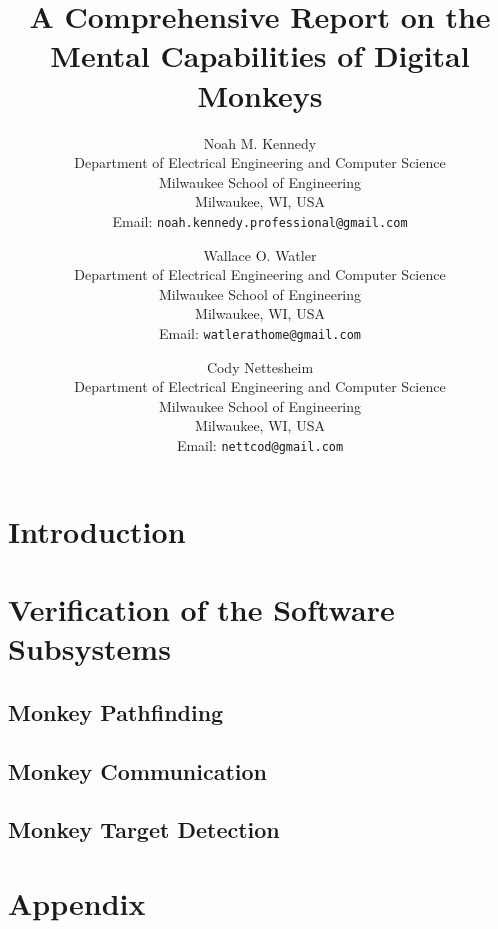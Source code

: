 \documentclass[11pt]{article}
\title{
    A Comprehensive Report on the Mental Capabilities of Digital Monkeys
}
\author{
    Noah M. Kennedy \\[3pt]
    {\small Department of Electrical Engineering and Computer Science} \\
    {\small Milwaukee School of Engineering} \\
    {\small Milwaukee, WI, USA} \\
    {\small Email: {\tt noah.kennedy.professional@gmail.com}} \\[12pt]
    \and
    Wallace O. Watler \\[3pt]
    {\small Department of Electrical Engineering and Computer Science} \\
    {\small Milwaukee School of Engineering} \\
    {\small Milwaukee, WI, USA} \\
    {\small Email: {\tt watlerathome@gmail.com}} \\[12pt]
    \and
    Cody Nettesheim \\[3pt]
    {\small Department of Electrical Engineering and Computer Science} \\
    {\small Milwaukee School of Engineering} \\
    {\small Milwaukee, WI, USA} \\
    {\small Email: {\tt nettcod@gmail.com}} \\[12pt]
}
\date{}
\begin{document}
    \maketitle

    \newpage

    \abstract
    

    \newpage

    \tableofcontents

    \newpage


    \section{Introduction}\label{sec:introduction}
    


    \section{Verification of the Software Subsystems}\label{sec:software-subsystems-results}

    \subsection{Monkey Pathfinding}\label{subsec:monkey-pathfinding}
    

    \subsection{Monkey Communication}\label{subsec:monkey-communication}
    

    \subsection{Monkey Target Detection}\label{subsec:monkey-target-detection}
    

    \section*{Appendix}\label{sec:appendix}

    \pagebreak

    \printbibliography
\end{document}
